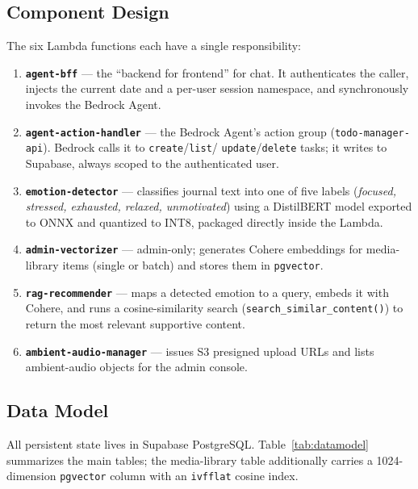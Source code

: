 \documentclass[a4paper,11pt]{article}
\begin{document}
	\subsection{Component Design}
	The six Lambda functions each have a single responsibility:
	\begin{enumerate}
		\item \textbf{\texttt{agent-bff}} --- the ``backend for frontend'' for chat. It
		      authenticates the caller, injects the current date and a per-user session
		      namespace, and synchronously invokes the Bedrock Agent.
		\item \textbf{\texttt{agent-action-handler}} --- the Bedrock Agent's action group
		      (\texttt{todo-manager-api}). Bedrock calls it to \texttt{create}/\texttt{list}/
		      \texttt{update}/\texttt{delete} tasks; it writes to Supabase, always scoped to the
		      authenticated user.
		\item \textbf{\texttt{emotion-detector}} --- classifies journal text into one of five
		      labels (\emph{focused, stressed, exhausted, relaxed, unmotivated}) using a
		      DistilBERT model exported to ONNX and quantized to INT8, packaged directly inside
		      the Lambda.
		\item \textbf{\texttt{admin-vectorizer}} --- admin-only; generates Cohere embeddings for
		      media-library items (single or batch) and stores them in \texttt{pgvector}.
		\item \textbf{\texttt{rag-recommender}} --- maps a detected emotion to a query, embeds
		      it with Cohere, and runs a cosine-similarity search (\texttt{search\_similar\_content()})
		      to return the most relevant supportive content.
		\item \textbf{\texttt{ambient-audio-manager}} --- issues S3 presigned upload URLs and
		      lists ambient-audio objects for the admin console.
	\end{enumerate}

	\subsection{Data Model}
	All persistent state lives in Supabase PostgreSQL. Table~\ref{tab:datamodel} summarizes the
	main tables; the media-library table additionally carries a 1024-dimension
	\texttt{pgvector} column with an \texttt{ivfflat} cosine index.
\end{document}
